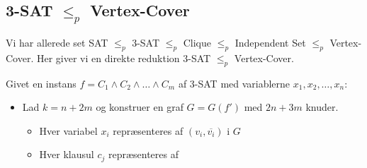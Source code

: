 \subsection{3-SAT $\le_{p}$ Vertex-Cover}%
\label{subsec:label}

Vi har allerede set SAT $\le_{p}$ 3-SAT $\le_{p}$ Clique $\le_{p}$ Independent Set $\le_{p}$ Vertex-Cover. Her giver vi en direkte reduktion 3-SAT $\le_{p}$ Vertex-Cover.

Givet en instans $f = C_{1} \wedge C_{2} \wedge \ldots \wedge C_{m}$ af 3-SAT med variablerne $x_{1}, x_{2}, \ldots, x_{n}$:
\begin{itemize}
	\item Lad $k = n + 2m$ og konstruer en graf $G = G(f')$ med $2n+3m$ knuder.
	      \begin{itemize}
		      \item Hver variabel $x_{i}$ repræsenteres af $(v_{i}, \overline{v_{i}})$ i $G$
		      \item Hver klausul $c_{j}$ repræsenteres af
	      \end{itemize}
\end{itemize}






